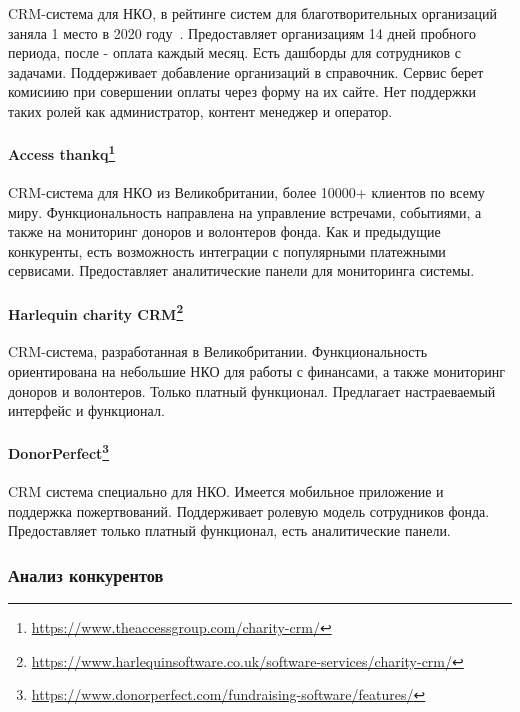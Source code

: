 \documentclass[a4paper,12pt,reqno]{article}
\begin{document}
CRM-система для НКО, в рейтинге систем для благотворительных организаций заняла 1 место в 2020 году~\cite{researchcrm}. Предоставляет организациям 14 дней пробного периода, после - оплата каждый месяц. Есть дашборды для сотрудников с задачами. Поддерживает добавление организаций в справочник. Сервис берет комисиию при совершении оплаты через форму на их сайте. Нет поддержки таких ролей как администратор, контент менеджер и оператор.

\paragraph*{Access thankq\footnote{\url{https://www.theaccessgroup.com/charity-crm/}}\\}

CRM-система для НКО из Великобритании, более 10000+ клиентов по всему миру. Функциональность направлена на управление встречами, событиями, а также на мониторинг доноров и волонтеров фонда. Как и предыдущие конкуренты, есть возможность интеграции с популярными платежными сервисами. Предоставляет аналитические панели для мониторинга системы.

\paragraph*{Harlequin charity CRM\footnote{\url{https://www.harlequinsoftware.co.uk/software-services/charity-crm/}}\\}

CRM-система, разработанная в Великобритании. Функциональность ориентирована на небольшие НКО для работы с финансами, а также мониторинг доноров и волонтеров. Только платный функционал. Предлагает настраеваемый интерфейс и функционал.

\paragraph*{DonorPerfect\footnote{\url{https://www.donorperfect.com/fundraising-software/features/}}\\}

CRM система специально для НКО. Имеется мобильное приложение и поддержка пожертвований. Поддерживает ролевую модель сотрудников фонда. Предоставляет только платный функционал, есть аналитические панели.


\subsubsection{Анализ конкурентов}
\end{document}
